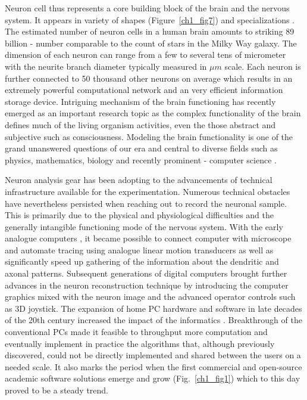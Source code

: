 Neuron cell thus represents a core building block of the brain and the nervous system. It appears in variety of shapes (Figure~\ref{ch1_fig7}) and specializations \cite{ascolitrees}. The estimated number of neuron cells in a human brain amounts to striking 89 billion \cite{herculano2009human} - number comparable to the count of stars in the Milky Way galaxy. The dimension of each neuron can range from a few to several tens of micrometer with the neurite branch diameter typically measured in $\mu m$ scale. Each neuron is further connected to 50 thousand other neurons on average which results in an extremely powerful computational network and an very efficient information storage device. Intriguing mechanism of the brain functioning has recently emerged as an important research topic as the complex functionality of the brain defines much of the living organism activities, even the those abstract and subjective such as consciousness. Modeling the brain functionality is one of the grand unanswered questions of our era and central to diverse fields such as physics, mathematics, biology and recently prominent - computer science \cite{markram2015reconstruction}.

Neuron analysis gear has been adopting to the advancements of technical infrastructure available for the experimentation. Numerous technical obstacles have nevertheless persisted when reaching out to record the neuronal sample. This is primarily due to the physical and physiological difficulties and the generally intangible functioning mode of the nervous system. With the early analogue computers \cite{glaser1965semi}, it became possible to connect computer with microscope and automate tracing using analogue linear motion transducers as well as significantly speed up gathering of the information about the dendritic and axonal patterns. Subsequent generations of digital computers \cite{capowski1981accurate,capowski1977computer} brought further advances in the neuron reconstruction technique by introducing the computer graphics mixed with the neuron image and the advanced operator controls such as 3D joystick. The expansion of home PC hardware and software in late decades of the 20th century increased the impact of the informatics \cite{halavi2012digital}. Breakthrough of the conventional PCs made it feasible to throughput more computation and eventually implement in practice the algorithms that, although previously discovered, could not be directly implemented and shared between the users on a needed scale. It also marks the period when the first commercial and open-source academic software solutions emerge and grow (Fig.~\ref{ch1_fig1}) which to this day proved to be a steady trend.

